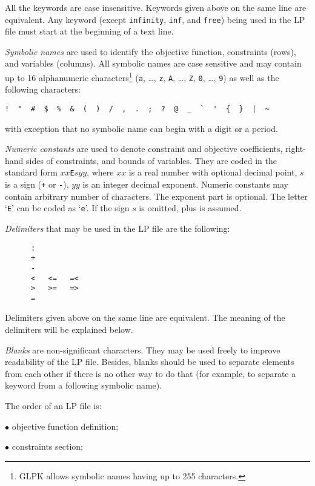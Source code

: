 \noindent
All the keywords are case insensitive. Keywords given above on the same
line are equivalent. Any keyword (except \verb|infinity|, \verb|inf|,
and \verb|free|) being used in the LP file must start at the beginning
of a text line.

{\it Symbolic names} are used to identify the objective function,
constraints (rows), and variables (columns). All symbolic names are case
sensitive and may contain up to 16 alphanumeric characters\footnote{GLPK
allows symbolic names having up to 255 characters.} (\verb|a|, \dots,
\verb|z|, \verb|A|, \dots, \verb|Z|, \verb|0|, \dots, \verb|9|) as well
as the following characters:

\begin{verbatim}
!  "  #  $  %  &  (  )  /  ,  .  ;  ?  @  _  `  '  {  }  |  ~
\end{verbatim}

\noindent
with exception that no symbolic name can begin with a digit or a period.

{\it Numeric constants} are used to denote constraint and objective
coefficients, right-hand sides of constraints, and bounds of variables.
They are coded in the standard form $xx$\verb|E|$syy$, where $xx$ is
a real number with optional decimal point, $s$ is a sign (\verb|+| or
\verb|-|), $yy$ is an integer decimal exponent. Numeric constants may
contain arbitrary number of characters. The exponent part is optional.
The letter `\verb|E|' can be coded as `\verb|e|'. If the sign $s$ is
omitted, plus is assumed.

{\it Delimiters} that may be used in the LP file are the following:

\begin{verbatim}
      :
      +
      -
      <   <=   =<
      >   >=   =>
      =
\end{verbatim}

\noindent
Delimiters given above on the same line are equivalent. The meaning of
the delimiters will be explained below.

{\it Blanks} are non-significant characters. They may be used freely to
improve readability of the LP file. Besides, blanks should be used to
separate elements from each other if there is no other way to do that
(for example, to separate a keyword from a following symbolic name).

The order of an LP file is:

$\bullet$ objective function definition;

$\bullet$ constraints section;

